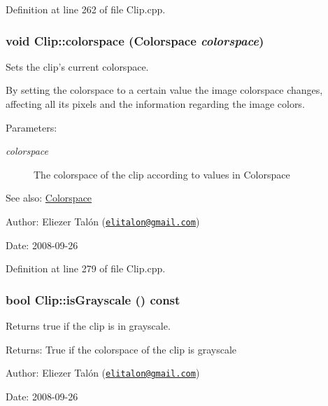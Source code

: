 Definition at line 262 of file Clip.cpp.\hypertarget{class_clip_7e7fa163b90c573adc424e022235c539}{
\subsubsection[colorspace]{\setlength{\rightskip}{0pt plus 5cm}void Clip::colorspace ({\bf Colorspace} {\em colorspace})}}
\label{class_clip_7e7fa163b90c573adc424e022235c539}


Sets the clip's current colorspace. 

By setting the colorspace to a certain value the image colorspace changes, affecting all its pixels and the information regarding the image colors.

\begin{Desc}
\item[Parameters:]
\begin{description}
\item[{\em colorspace}]The colorspace of the clip according to values in Colorspace\end{description}
\end{Desc}
\begin{Desc}
\item[See also:]\hyperlink{_colorspace_8h_7a7e24cdb2a27271343f0adceff89f65}{Colorspace}\end{Desc}
\begin{Desc}
\item[Author:]Eliezer Talón (\href{mailto:elitalon@gmail.com}{\tt elitalon@gmail.com}) \end{Desc}
\begin{Desc}
\item[Date:]2008-09-26 \end{Desc}


Definition at line 279 of file Clip.cpp.\hypertarget{class_clip_6f8d3a88f89461350228f5e7b7b9d694}{
\subsubsection[isGrayscale]{\setlength{\rightskip}{0pt plus 5cm}bool Clip::isGrayscale () const}}
\label{class_clip_6f8d3a88f89461350228f5e7b7b9d694}


Returns true if the clip is in grayscale. 

\begin{Desc}
\item[Returns:]True if the colorspace of the clip is grayscale\end{Desc}
\begin{Desc}
\item[Author:]Eliezer Talón (\href{mailto:elitalon@gmail.com}{\tt elitalon@gmail.com}) \end{Desc}
\begin{Desc}
\item[Date:]2008-09-26 \end{Desc}


